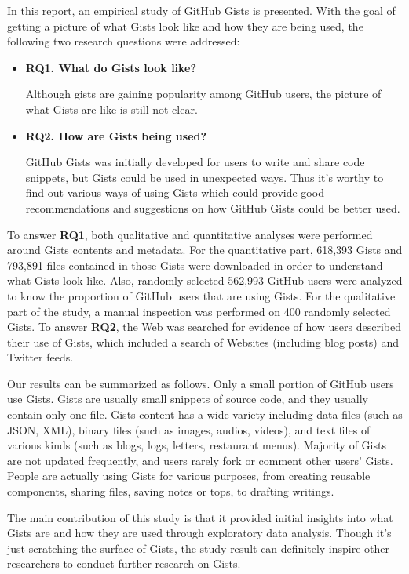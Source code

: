In this report, an empirical study of GitHub Gists is presented. With the goal of getting a picture of what Gists look like and how they are being used, the following two research questions were addressed:

\begin{itemize}

  \item {\bf RQ1. What do Gists look like?}
  
  Although gists are gaining popularity among GitHub users, the picture of what Gists are like is still not clear. 

  \item {\bf RQ2. How are Gists being used?}
  
  GitHub Gists was initially developed for users to write and share code snippets, but Gists could be used in unexpected ways. Thus it's worthy to find out various ways of using Gists which could provide good recommendations and suggestions on how GitHub Gists could be better used.
  
\end{itemize}
To answer {\bf RQ1}, both qualitative and quantitative analyses were performed around Gists contents and metadata. For the quantitative part, 618,393 Gists and 793,891 files contained in those Gists were downloaded in order to understand what Gists look like. Also, randomly selected 562,993 GitHub users were analyzed to know the proportion of GitHub users that are using Gists. For the qualitative part of the study, a manual inspection was performed on 400 randomly selected Gists. To answer {\bf RQ2}, the Web was searched for evidence of how users described their use of Gists, which included a search of Websites (including blog posts) and Twitter feeds.

Our results can be summarized as follows. Only a small portion of GitHub users use Gists. Gists are usually small snippets of source code, and they usually contain only one file. Gists content has a wide variety including data files (such as JSON, XML), binary files (such as images, audios, videos), and text files of various kinds (such as blogs, logs, letters, restaurant menus). Majority of Gists are not updated frequently, and users rarely fork or comment other users' Gists. People are actually using Gists for various purposes, from creating reusable components, sharing files, saving notes or tops, to drafting writings.

The main contribution of this study is that it provided initial insights into what Gists are and how they are used through exploratory data analysis. Though it's just scratching the surface of Gists, the study result can definitely inspire other researchers to conduct further research on Gists.